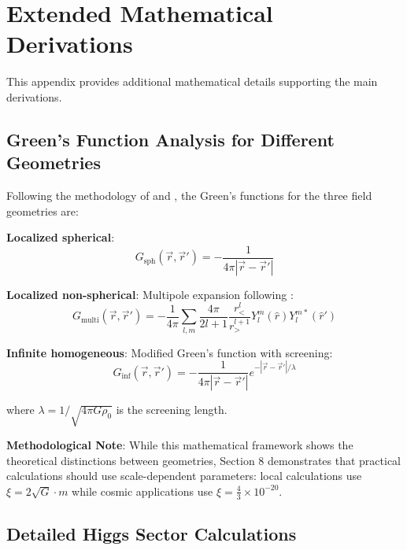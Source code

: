 \documentclass[12pt,a4paper]{article}
\begin{document}
	\section{Extended Mathematical Derivations}
	\label{app:extended_derivations}
	
	This appendix provides additional mathematical details supporting the main derivations.
	
	\subsection{Green's Function Analysis for Different Geometries}
	\label{app:greens_functions}
	
	Following the methodology of \citet{jackson1998} and \citet{duffy2001}, the Green's functions for the three field geometries are:
	
	\textbf{Localized spherical}: 
	\begin{equation}
		G_{\text{sph}}(\vec{r},\vec{r}') = -\frac{1}{4\pi|\vec{r}-\vec{r}'|}
	\end{equation}
	
	\textbf{Localized non-spherical}: Multipole expansion following \citet{jackson1998}:
	\begin{equation}
		G_{\text{multi}}(\vec{r},\vec{r}') = -\frac{1}{4\pi} \sum_{l,m} \frac{4\pi}{2l+1} \frac{r_<^l}{r_>^{l+1}} Y_l^m(\hat{r}) Y_l^{m*}(\hat{r}')
	\end{equation}
	
	\textbf{Infinite homogeneous}: Modified Green's function with screening:
	\begin{equation}
		G_{\text{inf}}(\vec{r},\vec{r}') = -\frac{1}{4\pi|\vec{r}-\vec{r}'|} e^{-|\vec{r}-\vec{r}'|/\lambda}
	\end{equation}
	
	where $\lambda = 1/\sqrt{4\pi G \rho_0}$ is the screening length.
	
	\textbf{Methodological Note}: While this mathematical framework shows the theoretical distinctions between geometries, Section 8 demonstrates that practical calculations should use scale-dependent parameters: local calculations use $\xi = 2\sqrt{G} \cdot m$ while cosmic applications use $\xi = \frac{4}{3} \times 10^{-20}$.
	
	\subsection{Detailed Higgs Sector Calculations}
	\label{app:higgs_calculations}
	
\end{document}
